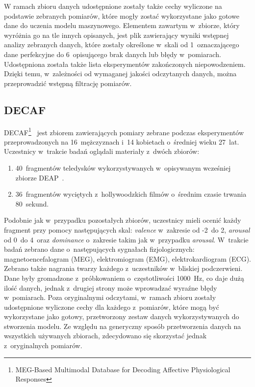 W ramach zbioru danych udostępnione zostały także cechy wyliczone na podstawie zebranych pomiarów, które mogły zostać wykorzystane jako gotowe dane do uczenia modelu maszynowego. Elementem zawartym w~zbiorze, który wyróżnia go na tle innych opisanych, jest plik zawierający wyniki wstępnej analizy zebranych danych, które zostały określone w~skali od 1~oznaczającego dane perfekcyjne do 6~opisującego brak danych lub błędy w~pomiarach.  Udostępniona została także lista eksperymentów zakończonych niepowodzeniem. Dzięki temu, w~zależności od wymaganej jakości odczytanych danych, można przeprowadzić wstępną filtrację pomiarów.

\subsection{DECAF}
DECAF\footnote{MEG-Based Multimodal Database for Decoding Affective Physiological Responses}~\cite{decaf_dataset_2015} jest zbiorem zawierających pomiary zebrane podczas eksperymentów przeprowadzonych na 16~mężczyznach i~14 kobietach o~średniej wieku 27~lat. Uczestnicy w~trakcie badań oglądali materiały z~dwóch zbiorów:
\begin{enumerate}
	\item  40~fragmentów teledysków wykorzystywanych w~opisywanym wcześniej zbiorze DEAP~\cite{deap_dataset_2011}.
	\item 36~fragmentów wyciętych z~hollywoodzkich filmów o~średnim czasie trwania 80~sekund.
\end{enumerate}
Podobnie jak w~przypadku pozostałych zbiorów, uczestnicy mieli ocenić każdy fragment przy pomocy następujących skal: \textit{valence} w~zakresie od -2~do 2, \textit{arousal} od 0~do 4~oraz \textit{dominance} o~zakresie takim jak w~przypadku \textit{arousal}. W~trakcie badań zebrano dane o~następujących sygnałach fizjologicznych: magnetoencefalogram (MEG), elektromiogram (EMG), elektrokardiogram (ECG). Zebrano także nagrania twarzy każdego z~uczestników w~bliskiej podczerwieni. Dane były gromadzone z~próbkowaniem o~częstotliwości 1000~Hz, co daje dużą ilość danych, jednak z~drugiej strony może wprowadzać wyraźne błędy w~pomiarach. Poza oryginalnymi odczytami, w~ramach zbioru zostały udostępnione wyliczone cechy dla każdego z~pomiarów, które mogą być wykorzystane jako gotowy, przetworzony zestaw danych wykorzystywanych do stworzenia modelu. Ze względu na generyczny sposób przetworzenia danych na wszystkich używanych zbiorach, zdecydowano się skorzystać jednak z~oryginalnych pomiarów. 

